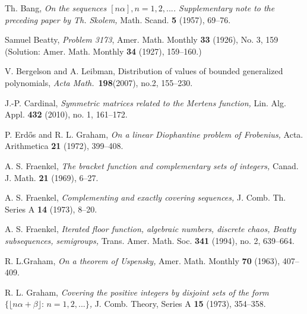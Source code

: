 \documentclass[12pt,letterpaper, reqno]{amsart}
\theoremstyle{definition}
\theoremstyle{remark}
\newcommand{\uu}{{u'}}
\newcommand{\vv}{{v'}}
\begin{document}
%



\begin{thebibliography}{99}

Th. Bang,
\emph{On the sequences $[n \alpha], n=1, 2, ...$.
Supplementary note to the preceding paper by Th. Skolem,}
Math. Scand. {\bf 5}  (1957), 69--76.

Samuel Beatty, {\em Problem 3173}, Amer. Math. Monthly
{\bf 33} (1926), No. 3, 159
(Solution: Amer. Math. Monthly {\bf 34} (1927), 159--160.) 

V. Bergelson and A. Leibman,
Distribution of values of bounded generalized polynomials,
\emph{Acta Math.}\ {\bf 198}(2007), no.2,  155--230.

J.-P. Cardinal,
\emph{Symmetric matrices related to the Mertens function,}
Lin. Alg. Appl. {\bf 432} (2010), no. 1, 161--172.
 
 
P. Erd\H{o}s and R. L. Graham,
\emph{On a linear Diophantine problem of Frobenius,}
Acta. Arithmetica {\bf 21} (1972), 399--408.
 
A. S. Fraenkel,
\emph{The bracket function and complementary sets of integers,}
Canad. J. Math. {\bf 21} (1969), 6--27.
 
A. S. Fraenkel,
\emph{Complementing and exactly covering sequences,}
J. Comb. Th. Series A {\bf 14} (1973), 8--20.
 
 A. S. Fraenkel,
\emph{Iterated floor function, algebraic numbers, discrete chaos,
 Beatty subsequences, semigroups,}
 Trans. Amer. Math. Soc. {\bf 341} (1994), no. 2, 639--664.
 
R. L.Graham,
\emph{On a theorem of Uspensky,}
Amer. Math. Monthly {\bf 70} (1963), 407--409.
 
 R. L. Graham,
 \emph{Covering the positive integers by disjoint sets
 of the form $\{ \lfloor n \alpha + \beta \rfloor: \, n=1, 2,...\}$,}
 J. Comb. Theory, Series A {\bf 15} (1973), 354--358.


\end{thebibliography}
\end{document}
